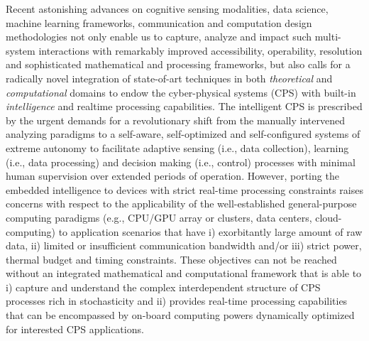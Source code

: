 Recent astonishing advances on cognitive sensing modalities, data science, machine learning frameworks, communication and computation design methodologies not only enable us to capture, analyze and impact such multi-system interactions with remarkably improved accessibility, operability, resolution and sophisticated mathematical and processing frameworks, but also calls for a radically novel integration of state-of-art techniques in both \textit{theoretical} and \textit{computational} domains to endow the cyber-physical systems (CPS) with built-in \textit{intelligence} and realtime processing capabilities. The  intelligent CPS is prescribed by the urgent demands for a revolutionary shift from the manually intervened analyzing paradigms to a self-aware, self-optimized and self-configured systems of extreme autonomy to facilitate adaptive sensing (i.e., data collection), learning (i.e., data processing) and decision making (i.e., control) processes with minimal human supervision over extended periods of operation. However, porting the embedded intelligence to devices with strict real-time processing constraints raises concerns with respect to the applicability of the well-established general-purpose computing paradigms (e.g., CPU/GPU array or clusters, data centers, cloud-computing) to application scenarios that have i) exorbitantly large amount of raw data, ii) limited  or insufficient communication bandwidth and/or iii) strict power,  thermal budget and timing constraints. These objectives can not be reached without an integrated mathematical and computational framework that is able to  i) capture and understand the complex interdependent structure of CPS processes rich in stochasticity and ii) provides real-time processing capabilities that can be encompassed by on-board computing powers dynamically optimized for interested CPS applications. \\
